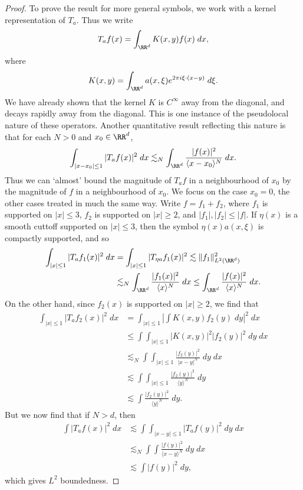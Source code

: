 \begin{proof}
    To prove the result for more general symbols, we work with a kernel representation of $T_a$. Thus we write
    \[ T_af(x) = \int_{\RR^d} K(x,y) f(x)\; dx, \]
    where
    \[ K(x,y) = \int_{\RR^d} a(x,\xi) e^{2 \pi i \xi \cdot (x - y)}\; d\xi. \]
    We have already shown that the kernel $K$ is $C^\infty$ away from the diagonal, and decays rapidly away from the diagonal. This is one instance of the pseudolocal nature of these operators. Another quantitative result reflecting this nature is that for each $N > 0$ and $x_0 \in \RR^d$,
    \[ \int_{|x - x_0| \leq 1} |T_af(x)|^2\; dx \lesssim_N \int_{\RR^d} \frac{|f(x)|^2}{\langle x - x_0 \rangle^N}\; dx. \]
    Thus we can `almost' bound the magnitude of $T_af$ in a neighbourhood of $x_0$ by the magnitude of $f$ in a neighbourhood of $x_0$. We focus on the case $x_0 = 0$, the other cases treated in much the same way. Write $f = f_1 + f_2$, where $f_1$ is supported on $|x| \leq 3$, $f_2$ is supported on $|x| \geq 2$, and $|f_1|, |f_2| \leq |f|$. If $\eta(x)$ is a smooth cuttoff supported on $|x| \leq 3$, then the symbol $\eta(x) a(x,\xi)$ is compactly supported, and so
    \begin{align*}
        \int_{|x| \leq 1} |T_a f_1(x)|^2\; dx &= \int_{|x| \leq 1} |T_{\eta a} f_1(x)|^2 \lesssim \| f_1 \|_{L^2(\RR^d)}^2\\
        &\lesssim_N \int_{\RR^d} \frac{|f_1(x)|^2}{\langle x \rangle^N}\; dx \leq \int_{\RR^d} \frac{|f(x)|^2}{\langle x \rangle^N}\; dx.
    \end{align*}
    On the other hand, since $f_2(x)$ is supported on $|x| \geq 2$, we find that
    \begin{align*}
        \int_{|x| \leq 1} |T_a f_2(x)|^2\; dx &= \int_{|x| \leq 1} \left| \int K(x,y) f_2(y)\; dy \right|^2\; dx\\
        &\leq \int \int_{|x| \leq 1} |K(x,y)|^2 |f_2(y)|^2\; dy\; dx\\
        &\lesssim_N \int \int_{|x| \leq 1} \frac{|f_2(y)|^2}{|x - y|^N}\; dy\; dx\\
        &\lesssim \int \int_{|x| \leq 1} \frac{|f_2(y)|^2}{\langle y \rangle^N}\; dy\\
        &\lesssim \int \frac{|f_2(y)|^2}{\langle y \rangle^N}\; dy.
    \end{align*}
    But we now find that if $N > d$, then
    \begin{align*}
        \int |T_af(x)|^2\; dx &\lesssim \int \int_{|x - y| \leq 1} |T_af(y)|^2\; dy\; dx\\
        &\lesssim_N \int \int \frac{|f(y)|^2}{\langle x - y \rangle^N}\; dy\; dx\\
        &\lesssim \int |f(y)|^2\; dy,
    \end{align*}
    which gives $L^2$ boundedness.
\end{proof}

